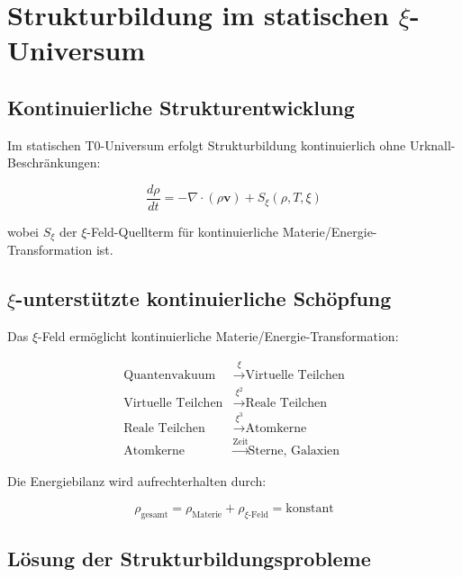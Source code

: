 \documentclass[12pt,a4paper]{article}
\newcommand{\xipar}{\xi}
\begin{document}
	\section{Strukturbildung im statischen $\xi$-Universum}
	
	\subsection{Kontinuierliche Strukturentwicklung}
	
	Im statischen T0-Universum erfolgt Strukturbildung kontinuierlich ohne Urknall-Beschränkungen:
	
	\begin{equation}
		\frac{d\rho}{dt} = -\nabla \cdot (\rho \mathbf{v}) + S_\xi(\rho, T, \xipar)
	\end{equation}
	
	wobei $S_\xi$ der $\xi$-Feld-Quellterm für kontinuierliche Materie/Energie-Transformation ist.
	
	\subsection{$\xi$-unterstützte kontinuierliche Schöpfung}
	
	Das $\xi$-Feld ermöglicht kontinuierliche Materie/Energie-Transformation:
	
	\begin{align}
		\text{Quantenvakuum} &\xrightarrow{\xipar} \text{Virtuelle Teilchen} \\
		\text{Virtuelle Teilchen} &\xrightarrow{\xipar^2} \text{Reale Teilchen} \\
		\text{Reale Teilchen} &\xrightarrow{\xipar^3} \text{Atomkerne} \\
		\text{Atomkerne} &\xrightarrow{\text{Zeit}} \text{Sterne, Galaxien}
	\end{align}
	
	Die Energiebilanz wird aufrechterhalten durch:
	
	\begin{equation}
		\rho_{\text{gesamt}} = \rho_{\text{Materie}} + \rho_{\xi\text{-Feld}} = \text{konstant}
	\end{equation}
	
	\subsection{Lösung der Strukturbildungsprobleme}
	
\end{document}
